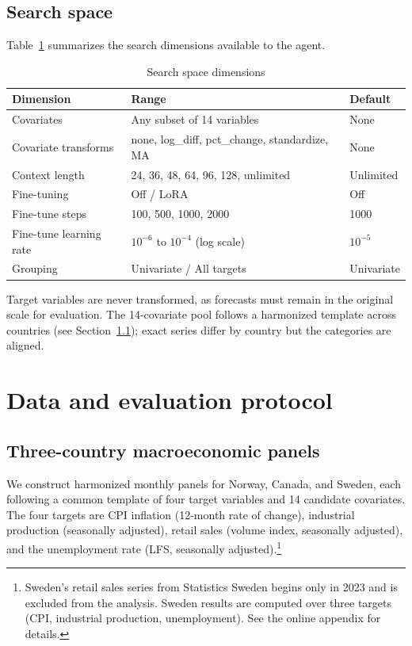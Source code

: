 \documentclass[12pt,a4paper]{article}
\begin{document}
\subsection{Search space}
\label{sec:search_space}

Table~\ref{tab:search_space} summarizes the search dimensions available to the agent.

\begin{table}[H]
\centering
\caption{Search space dimensions}
\label{tab:search_space}
\begin{tabular}{lll}
\toprule
Dimension & Range & Default \\
\midrule
Covariates & Any subset of 14 variables & None \\
Covariate transforms & none, log\_diff, pct\_change, standardize, MA & None \\
Context length & 24, 36, 48, 64, 96, 128, unlimited & Unlimited \\
Fine-tuning & Off / LoRA & Off \\
Fine-tune steps & 100, 500, 1000, 2000 & 1000 \\
Fine-tune learning rate & $10^{-6}$ to $10^{-4}$ (log scale) & $10^{-5}$ \\
Grouping & Univariate / All targets & Univariate \\
\bottomrule
\end{tabular}
\end{table}

Target variables are never transformed, as forecasts must remain in the original scale for evaluation. The 14-covariate pool follows a harmonized template across countries (see Section~\ref{sec:panel}); exact series differ by country but the categories are aligned.


\section{Data and evaluation protocol}
\label{sec:data}

\subsection{Three-country macroeconomic panels}
\label{sec:panel}

We construct harmonized monthly panels for Norway, Canada, and Sweden, each following a common template of four target variables and 14 candidate covariates. The four targets are CPI inflation (12-month rate of change), industrial production (seasonally adjusted), retail sales (volume index, seasonally adjusted), and the unemployment rate (LFS, seasonally adjusted).\footnote{Sweden's retail sales series from Statistics Sweden begins only in 2023 and is excluded from the analysis. Sweden results are computed over three targets (CPI, industrial production, unemployment). See the online appendix for details.}
\end{document}
